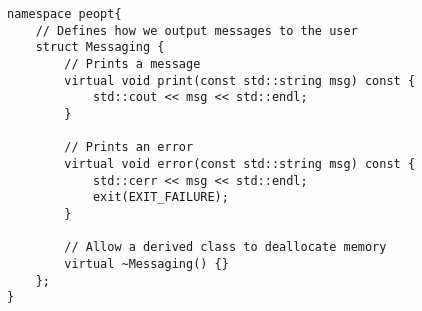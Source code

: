 \begin{lstlisting}[style=C++]
namespace peopt{
    // Defines how we output messages to the user
    struct Messaging {
        // Prints a message
        virtual void print(const std::string msg) const {
            std::cout << msg << std::endl;
        }

        // Prints an error
        virtual void error(const std::string msg) const {
            std::cerr << msg << std::endl;
            exit(EXIT_FAILURE);
        }

        // Allow a derived class to deallocate memory
        virtual ~Messaging() {}
    };
}
\end{lstlisting}
